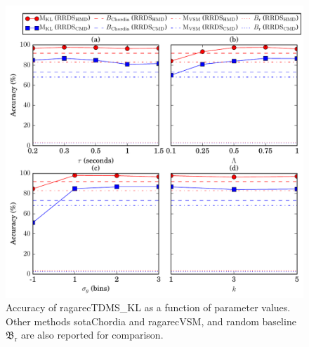 \begin{figure}[h]
	\begin{center}
		\includegraphics[width=\figSizeHundred]{ch07_ragaRecognition/figures/AccuracyVsParameters_tdms.pdf}
	\end{center}
	\caption[Accuracy of \acrshort{ragarecTDMS_KL} as a function of different parameter values]{Accuracy of \acrshort{ragarecTDMS_KL} as a function of parameter values. Other methods \acrshort{sotaChordia} and \acrshort{ragarecVSM}, and random baseline $\mathfrak{B}_\mathrm{r}$ are also reported for comparison.} 
	\label{fig:accuracy_vs_parameter_values_tdms}
\end{figure}

